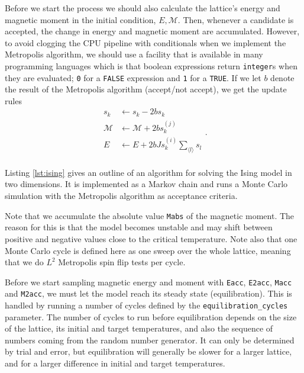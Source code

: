 \documentclass[]{article}
\begin{document}
Before we start the process we should also calculate the lattice's energy and magnetic moment in the initial condition, $E, \mathcal{M}$. Then, whenever a candidate is accepted, the change in energy and magnetic moment are accumulated. However, to avoid clogging the CPU pipeline with conditionals when we implement the Metropolis algorithm, we should use a facility that is available in many programming languages which is that boolean expressions return \lstinline|integer|s when they are evaluated; \lstinline|0| for a \lstinline|FALSE| expression and \lstinline|1| for a \lstinline|TRUE|. If we let $b$ denote the result of the Metropolis algorithm (accept/not accept), we get the update rules
\begin{equation}
\begin{aligned}
	s_k &\leftarrow s_k - 2bs_k \\
	\mathcal{M} &\leftarrow \mathcal{M} + 2bs_k^{(j)} \\
	E &\leftarrow E + 2bJ s_k^{(i)} \sum_{\langle l \rangle} s_l \\
\end{aligned}.
\end{equation}

\vspace{5mm}

Listing \ref{lst:ising} gives an outline of an algorithm for solving the Ising model in two dimensions. It is implemented as a Markov chain and runs a Monte Carlo simulation with the Metropolis algorithm as acceptance criteria. 

Note that we accumulate the absolute value \lstinline|Mabs| of the magnetic moment. The reason for this is that the model becomes unstable and may shift between positive and negative values close to the critical temperature. Note also that one Monte Carlo cycle is defined here as one sweep over the whole lattice, meaning that we do $L^2$ Metropolis spin flip tests per cycle. 

Before we start sampling magnetic energy and moment with \lstinline|Eacc|, \lstinline|E2acc|, \lstinline|Macc| and \lstinline|M2acc|, we must let the model reach its steady state (equilibration). This is handled by running a number of cycles defined by the \lstinline|equilibration_cycles| parameter. The number of cycles to run before equilibration depends on the size of the lattice, its initial and target temperatures, and also the sequence of numbers coming from the random number generator. It can only be determined by trial and error, but equilibration will generally be slower for a larger lattice, and for a larger difference in initial and target temperatures.
\end{document}
